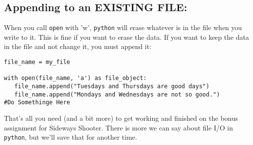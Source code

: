 \documentclass[11pt]{article}
\begin{document}
\subsection{Appending to an EXISTING FILE:}
\label{sec:org7d3fdbf}
When you call \texttt{open} with 'w', \texttt{python} will erase whatever is in the file when you write to it. This
is fine if you want to erase the data. If you want to keep the data in the file and not change it, you
must append it:

\begin{verbatim}
file_name = my_file

with open(file_name, 'a') as file_object:
   file_name.append("Tuesdays and Thursdays are good days")
   file_name.append("Mondays and Wednesdays are not so good.")
#Do Somethinge Here

\end{verbatim}

That's all you need (and a bit more) to get working and finished on the bonus assignment for Sideways Shooter.
There is more we can say about file I/O in \texttt{python}, but we'll save that for another time.
\end{document}
